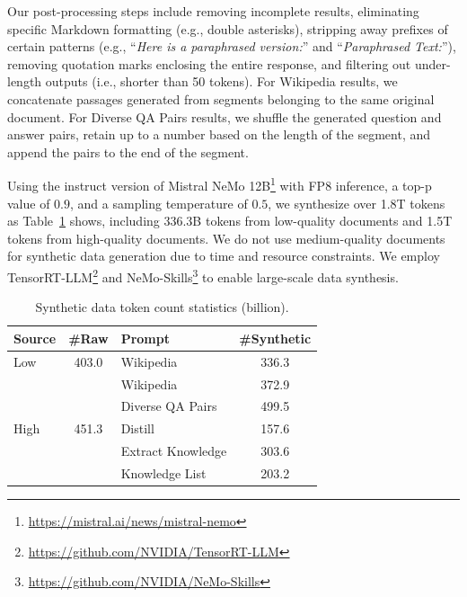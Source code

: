 \documentclass[11pt]{article}
\begin{document}
Our post-processing steps include removing incomplete results, eliminating specific Markdown formatting (e.g., double asterisks), stripping away prefixes of certain patterns (e.g., ``\textit{Here is a paraphrased version:}'' and ``\textit{Paraphrased Text:}''), removing quotation marks enclosing the entire response, and filtering out under-length outputs (i.e., shorter than 50 tokens).
For \textrm{Wikipedia} results, we concatenate passages generated from segments belonging to the same original document.
For \textrm{Diverse QA Pairs} results, we shuffle the generated question and answer pairs, retain up to a number based on the length of the segment, and append the pairs to the end of the segment.

Using the instruct version of Mistral NeMo 12B\footnote{\url{https://mistral.ai/news/mistral-nemo}} with FP8 inference, a top-p value of $0.9$, and a sampling temperature of $0.5$, we synthesize over 1.8T tokens as Table~\ref{table:synthetic_data_stats} shows, including 336.3B tokens from low-quality documents and 1.5T tokens from high-quality documents.  We do not use medium-quality documents for synthetic data generation due to time and resource constraints. We employ TensorRT-LLM\footnote{\url{https://github.com/NVIDIA/TensorRT-LLM}} and NeMo-Skills\footnote{\url{https://github.com/NVIDIA/NeMo-Skills}} to enable large-scale data synthesis.

\begin{table}[!hbt]
    \small
    \centering
    \begin{tabularx}{\linewidth} {l c X c}
    \toprule
    \textbf{Source}      & \textbf{\#Raw}          & \textbf{Prompt}            & \textbf{\#Synthetic} \\
    \midrule
    \textrm{Low}  & 403.0          & \textrm{Wikipedia}      & 336.3 \\
    \midrule
    \multirow{5}{*}{\textrm{High}}  &  \multirow{5}{*}{451.3} & \textrm{Wikipedia}         & 372.9 \\
                         &                         & \textrm{Diverse QA Pairs}  & 499.5 \\
                         &                         & \textrm{Distill}           & 157.6 \\
                         &                         & \textrm{Extract Knowledge} & 303.6 \\
                         &                         & \textrm{Knowledge List}    & 203.2 \\
    \bottomrule
    \end{tabularx}
    \caption{Synthetic data token count statistics (billion).}
    \label{table:synthetic_data_stats}
\end{table}
\end{document}
